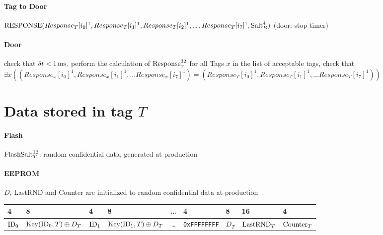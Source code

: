\documentclass[a4paper,10pt]{scrartcl}
\begin{document}
\paragraph{Tag to Door} $\textnormal{RESPONSE}( Response_T[i_0]^1, Response_T[i_1]^1, Response_T[i_2]^1, \ldots Response_T[i_7]^1, \textnormal{Salt}_B^4 )$
(door: stop timer)

\paragraph{Door} check that $\delta t < 1\,\textnormal{ms}$, perform the calculation of $\textnormal{Response}_x^{32}$ for all Tags $x$ in the list of acceptable tags, check that $\exists x ((Response_x[i_0]^1, Response_x[i_1]^1, \ldots Response_x[i_7]^1) = (Response_T[i_0]^1, Response_T[i_1]^1, \ldots Response_T[i_7]^1))$

\section{Data stored in tag $T$}
\paragraph{Flash} $\textnormal{FlashSalt}_T^{12}$: random confidential data, generated at production
\paragraph{EEPROM} $D$, LastRND and Counter are initialized to random confidential data at production

\begin{tabular}{|*{2}{l|l||}c||l|l||l||l|}\hline
  4 & 8 & 4 & 8 & \ldots & 4 & 8 & 16 & 4 \\\hline
  $\textnormal{ID}_0$ & $\textnormal{Key}(\textnormal{ID}_0,T) \oplus D_T$ &
  $\textnormal{ID}_1$ & $\textnormal{Key}(\textnormal{ID}_1,T) \oplus D_T$ & \ldots &
  \verb|0xFFFFFFFF| & $D_T$ &
  $\textnormal{LastRND}_T$ & $\textnormal{Counter}_T$ \\\hline
\end{tabular}
\end{document}
